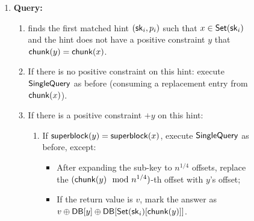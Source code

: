 \begin{figure}[p]
\begin{minipage}{\textwidth}
\begin{mdframed}
\begin{itemize}[leftmargin=3mm,itemsep=1pt]
                             
            \end{itemize}
            
            
            
            
            \begin{enumerate}[leftmargin=5mm,itemsep=1pt]
                \item 
                {\bf Query:}
                \begin{enumerate}[leftmargin=5mm,itemsep=1pt]
                    \item 
                    \Client finds {the first} matched hint $(\mathsf{sk}_i, p_i)$
                    such that $x\in \mathsf{Set}(\mathsf{sk}_i)$ and the hint does not have a
                    positive constraint $y$ that $\mathsf{chunk}(y)=\mathsf{chunk}(x)$.

                        \item If there is no positive constraint on this hint:
                        execute $\mathsf{SingleQuery}$ as before (consuming a
                        replacement entry from $\mathsf{chunk}(x)$).
                        \item  If there is a positive constraint $+y$ on this
                        hint: 
                        \begin{enumerate}
                            \item If $\mathsf{superblock}(y)=\mathsf{superblock}(x)$, execute
                            $\mathsf{SingleQuery}$ as before, except:
                            \begin{itemize}
                                \item After expanding the sub-key to $n^{1/4}$
                                offsets, replace the $(\mathsf{chunk}(y) \mod
                                n^{1/4})$-th offset with $y$'s offset; 
                                \item If the return value is $v$, mark the
                                answer as $v\oplus\mathsf{DB}[y]\oplus
                                \mathsf{DB}[\mathsf{Set}(\mathsf{sk}_i)[\mathsf{chunk}(y)]]$. 
                            \end{itemize}


\end{enumerate}
\end{enumerate}
\end{enumerate}
\end{mdframed}
\end{minipage}
\end{figure}
